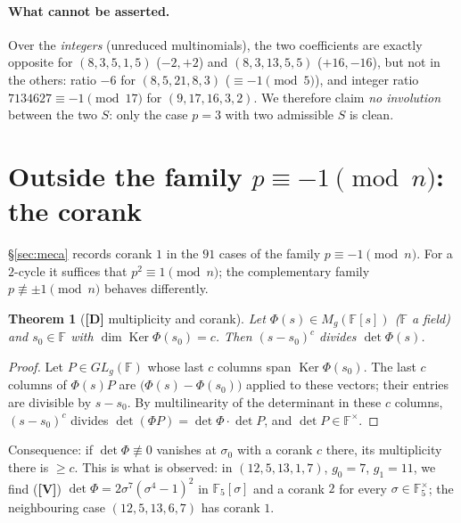 \documentclass[11pt,a4paper]{article}
\newtheorem{theorem}{Theorem}[section]
\newcommand{\F}{\mathbb{F}}
\DeclareMathOperator{\Ker}{Ker}
\begin{document}
\paragraph{What cannot be asserted.} Over the \emph{integers} (unreduced
multinomials), the two coefficients are exactly opposite for $(8,3,5,1,5)$
($-2,+2$) and $(8,3,13,5,5)$ ($+16,-16$), but not in the others: ratio $-6$ for
$(8,5,21,8,3)$ ($\equiv-1\pmod5$), and integer ratio $7134627\equiv-1\pmod{17}$
for $(9,17,16,3,2)$. We therefore claim \emph{no involution} between the two $S$:
only the case $p=3$ with two admissible $S$ is clean.

\section{Outside the family $p\equiv-1\pmod n$: the corank}
\label{sec:corang}

\S\ref{sec:meca} records corank $1$ in the $91$ cases of the family
$p\equiv-1\pmod n$. For a $2$-cycle it suffices that $p^2\equiv1\pmod n$; the
complementary family $p\not\equiv\pm1\pmod n$ behaves differently.

\begin{theorem}[\textbf{[D]} multiplicity and corank]
\label{thm:ordcor}
Let $\Phi(s)\in M_g(\F[s])$ ($\F$ a field) and $s_0\in\F$ with
$\dim\Ker\Phi(s_0)=c$. Then $(s-s_0)^c$ divides $\det\Phi(s)$.
\end{theorem}

\begin{proof}
Let $P\in GL_g(\F)$ whose last $c$ columns span $\Ker\Phi(s_0)$. The last $c$
columns of $\Phi(s)P$ are $\bigl(\Phi(s)-\Phi(s_0)\bigr)$ applied to these
vectors; their entries are divisible by $s-s_0$. By multilinearity of the
determinant in these $c$ columns, $(s-s_0)^c$ divides $\det(\Phi P)=\det\Phi\cdot\det P$,
and $\det P\in\F^\times$. \end{proof}

Consequence: if $\det\Phi\not\equiv0$ vanishes at $\sigma_0$ with a corank $c$
there, its multiplicity there is $\ge c$. This is what is observed: in
$(12,5,13,1,7)$, $g_0=7$, $g_1=11$, we find (\textbf{[V]})
$\det\Phi=2\sigma^7(\sigma^4-1)^2$ in $\F_5[\sigma]$ and a corank $2$ for every
$\sigma\in\F_5^\times$; the neighbouring case $(12,5,13,6,7)$ has corank $1$.
\end{document}
